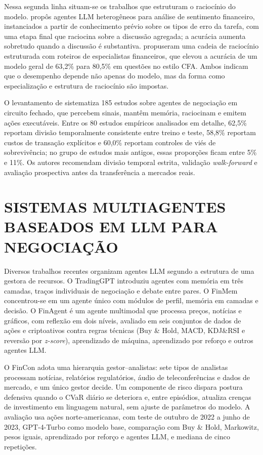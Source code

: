 \documentclass{eic-bcc-tcc}
\begin{document}
Nessa segunda linha situam-se os trabalhos que estruturam o raciocínio do modelo. \citet{Xing2024} propôs agentes LLM heterogêneos para análise de sentimento financeiro, instanciados a partir de conhecimento prévio sobre os tipos de erro da tarefa, com uma etapa final que raciocina sobre a discussão agregada; a acurácia aumenta sobretudo quando a discussão é substantiva. \citet{FinCoT2025} propuseram uma cadeia de raciocínio estruturada com roteiros de especialistas financeiros, que elevou a acurácia de um modelo geral de 63,2\% para 80,5\% em questões no estilo CFA. Ambos indicam que o desempenho depende não apenas do modelo, mas da forma como especialização e estrutura de raciocínio são impostas.

O levantamento de \citet{Xia2026} sistematiza 185 estudos sobre agentes de negociação em circuito fechado, que percebem sinais, mantêm memória, raciocinam e emitem ações executáveis. Entre os 80 estudos empíricos analisados em detalhe, 62,5\% reportam divisão temporalmente consistente entre treino e teste, 58,8\% reportam custos de transação explícitos e 60,0\% reportam controles de viés de sobrevivência; no grupo de estudos mais antigos, essas proporções ficam entre 5\% e 11\%. Os autores recomendam divisão temporal estrita, validação \textit{walk-forward} e avaliação prospectiva antes da transferência a mercados reais.

\section{SISTEMAS MULTIAGENTES BASEADOS EM LLM PARA NEGOCIAÇÃO}
\label{sec:rel-mas}

Diversos trabalhos recentes organizam agentes LLM segundo a estrutura de uma gestora de recursos. O TradingGPT \citep{Li2023} introduziu agentes com memória em três camadas, traços individuais de negociação e debate entre pares. O FinMem \citep{FinMem2024} concentrou-se em um agente único com módulos de perfil, memória em camadas e decisão. O FinAgent \citep{FinAgent2024} é um agente multimodal que processa preços, notícias e gráficos, com reflexão em dois níveis, avaliado em seis conjuntos de dados de ações e criptoativos contra regras técnicas (Buy \& Hold, MACD, KDJ\&RSI e reversão por \textit{z-score}), aprendizado de máquina, aprendizado por reforço e outros agentes LLM.

O FinCon \citep{FinCon2024} adota uma hierarquia gestor--analistas: sete tipos de analistas processam notícias, relatórios regulatórios, áudio de teleconferências e dados de mercado, e um único gestor decide. Um componente de risco dispara postura defensiva quando o CVaR diário se deteriora e, entre episódios, atualiza crenças de investimento em linguagem natural, sem ajuste de parâmetros do modelo. A avaliação usa ações norte-americanas, com teste de outubro de 2022 a junho de 2023, GPT-4-Turbo como modelo base, comparação com Buy \& Hold, Markowitz, pesos iguais, aprendizado por reforço e agentes LLM, e mediana de cinco repetições.
\end{document}
